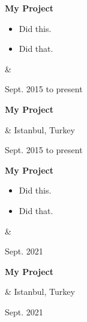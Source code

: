 \documentclass[10pt, letterpaper]{article}
\newenvironment{highlights}{
        \begin{itemize}[
                topsep=0pt,
                parsep=0.10 cm,
                partopsep=0pt,
                itemsep=0pt,
                after=\vspace{-1\baselineskip},
                leftmargin=0.4 cm + 3pt
            ]
    }{
        \end{itemize}
    } %
\let\originalTabularx\tabularx
\let\originalEndTabularx\endtabularx
\renewenvironment{tabularx}{\bgroup\centering\originalTabularx}{\originalEndTabularx\par\egroup}
\begin{document}
        \vspace{0.2 cm}
        \begin{tabularx}{
            \textwidth-0.4 cm-0.13cm
        }{
            K{0.2 cm}
            R{4.1 cm}
        }
            \textbf{My Project}

            \vspace{0.10 cm}

            \begin{highlights}
                \item Did this.
                \item Did that.
            \end{highlights}
            &
            

            Sept. 2015 to present
        \end{tabularx}


        \vspace{0.2 cm}
        \begin{tabularx}{
            \textwidth-0.4 cm-0.13cm
        }{
            K{0.2 cm}
            R{4.1 cm}
        }
            \textbf{My Project}

            \vspace{0.10 cm}

            &
            Istanbul, Turkey

            Sept. 2015 to present
        \end{tabularx}


        \vspace{0.2 cm}
        \begin{tabularx}{
            \textwidth-0.4 cm-0.13cm
        }{
            K{0.2 cm}
            R{4.1 cm}
        }
            \textbf{My Project}

            \vspace{0.10 cm}

            \begin{highlights}
                \item Did this.
                \item Did that.
            \end{highlights}
            &
            

            Sept. 2021
        \end{tabularx}


        \vspace{0.2 cm}
        \begin{tabularx}{
            \textwidth-0.4 cm-0.13cm
        }{
            K{0.2 cm}
            R{4.1 cm}
        }
            \textbf{My Project}

            \vspace{0.10 cm}

            &
            Istanbul, Turkey

            Sept. 2021
        \end{tabularx}
\end{document}
